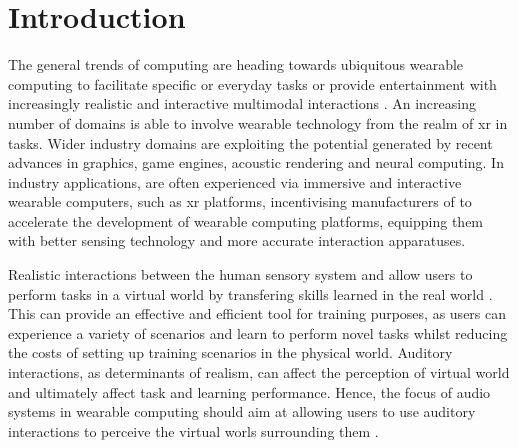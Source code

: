 \section{Introduction}
The general trends of computing are heading towards ubiquitous wearable computing to facilitate specific or everyday tasks or provide entertainment with increasingly realistic and interactive multimodal interactions \citep{al2022review, slater2009visual, park2022metaverse, rubio2017immersive}. An increasing number of domains is able to involve wearable technology from the realm of \acrshort{xr} in tasks. Wider industry domains are exploiting the potential generated by recent advances in graphics, game engines, acoustic rendering and neural computing. In industry applications,  are often experienced via immersive and interactive wearable computers, such as \acrshort{xr} platforms, incentivising manufacturers of  to accelerate the development of wearable computing platforms, equipping them with better sensing technology and more accurate interaction apparatuses.\par
Realistic interactions between the human sensory system and  allow users to perform tasks in a virtual world by transfering skills learned in the real world \citep{jot2021rendering,Woodward2021}. This can provide an effective and efficient tool for training purposes, as users can experience a variety of scenarios and learn to perform novel tasks whilst reducing the costs of setting up training scenarios in the physical world. Auditory interactions, as determinants of realism, can affect the perception of virtual world and ultimately affect task and learning performance. Hence, the focus of audio systems in wearable computing should aim at allowing users to use auditory interactions to perceive the virtual worls surrounding them \citep{yang2022audio}.

